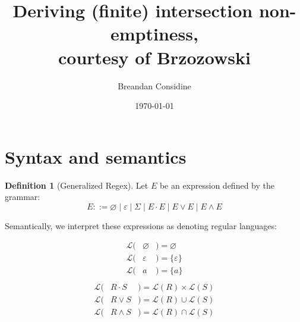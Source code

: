 \documentclass[11pt]{article}
\title{Deriving (finite) intersection non-emptiness,\\ courtesy of Brzozowski}
\author{Breandan Considine}
\date{\today}
\theoremstyle{plain}
\theoremstyle{definition}
\newtheorem{definition}{Definition}
\begin{document}
\maketitle

\section{Syntax and semantics}

\begin{definition}[Generalized Regex]
  Let \( E \) be an expression defined by the grammar:
  \[
    E ::= \varnothing \mid \varepsilon \mid \Sigma \mid E \cdot E \mid E \lor E \mid E \land E
  \]

\noindent Semantically, we interpret these expressions as denoting regular languages:\vspace{-1cm}
  \setlength{\columnseprule}{0pt}
  \setlength{\columnsep}{-3cm}
  \begin{multicols}{2}
    \begin{eqnarray*}
      \mathcal{L}(& \varnothing & ) = \varnothing \\
      \mathcal{L}(& \varepsilon & ) = \{\varepsilon\} \\
      \mathcal{L}(& a           & ) = \{a\}\\
    \end{eqnarray*} \break\vspace{-0.45cm}
    \begin{eqnarray*}
      \mathcal{L}(& R\cdot S    & ) = \mathcal{L}(R) \times \mathcal{L}(S)\\
      \mathcal{L}(& R\vee S     & ) = \mathcal{L}(R) \cup \mathcal{L}(S)\\
      \mathcal{L}(& R\land S    & ) = \mathcal{L}(R) \cap \mathcal{L}(S)\\
    \end{eqnarray*}
  \end{multicols}
\end{definition}
\end{document}
